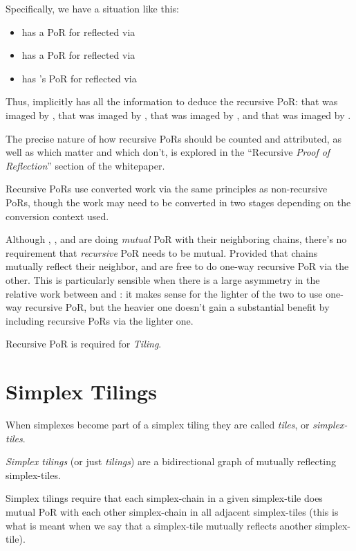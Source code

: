 \documentclass[a4paper,]{article}
\begin{document}
Specifically, we have a situation like this:
\begin{itemize}
  \item {} has a PoR for \BL{} reflected via 
  \item {} has a PoR for  reflected via 
  \item {} has 's PoR for  reflected via 
\end{itemize}
Thus,  implicitly has all the information to deduce the recursive PoR: that \BL{} was imaged by , that  was imaged by , that  was imaged by , and that  was imaged by .

The precise nature of how recursive PoRs should be counted and attributed, as well as which matter and which don't, is explored in the ``Recursive \emph{Proof of Reflection}'' section of the whitepaper.

Recursive PoRs use converted work via the same principles as non-recursive PoRs, though the work may need to be converted in two stages depending on the conversion context used.

Although \cL, \cM, and \cR are doing \emph{mutual} PoR with their neighboring chains, there's no requirement that \emph{recursive} PoR needs to be mutual.
Provided that chains mutually reflect their neighbor, \cL and \cR are free to do one-way recursive PoR via the other.
This is particularly sensible when there is a large asymmetry in the relative work between \cL and \cR: it makes sense for the lighter of the two to use one-way recursive PoR, but the heavier one doesn't gain a substantial benefit by including recursive PoRs via the lighter one.

Recursive PoR is required for \emph{Tiling}.

\section{Simplex Tilings}

When simplexes become part of a simplex tiling they are called \emph{tiles}, or \emph{simplex-tiles}.

\emph{Simplex tilings} (or just \emph{tilings}) are a bidirectional graph of mutually reflecting simplex-tiles.

Simplex tilings require that each simplex-chain in a given simplex-tile does mutual PoR with each other simplex-chain in all adjacent simplex-tiles (this is what is meant when we say that a simplex-tile mutually reflects another simplex-tile).
\end{document}
